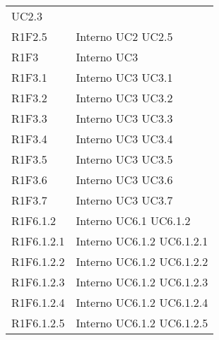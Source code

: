 \begin{longtable}{p{2.5cm}!{\VRule[1pt]}p{2.5cm}}
 \newline UC2.3
 \\
R1F2.5 & Interno \newline UC2
 \newline UC2.5
 \\
R1F3 & Interno \newline UC3
 \\
R1F3.1 & Interno \newline UC3
 \newline UC3.1
 \\
R1F3.2 & Interno \newline UC3
 \newline UC3.2
 \\
R1F3.3 & Interno \newline UC3
 \newline UC3.3
 \\
R1F3.4 & Interno \newline UC3
 \newline UC3.4
 \\
R1F3.5 & Interno \newline UC3
 \newline UC3.5
 \\
R1F3.6 & Interno \newline UC3
 \newline UC3.6
 \\
R1F3.7 & Interno \newline UC3
 \newline UC3.7
 \\
R1F6.1.2 & Interno \newline UC6.1
 \newline UC6.1.2
 \\
R1F6.1.2.1 & Interno \newline UC6.1.2
 \newline UC6.1.2.1
 \\
R1F6.1.2.2 & Interno \newline UC6.1.2
 \newline UC6.1.2.2
 \\
R1F6.1.2.3 & Interno \newline UC6.1.2
 \newline UC6.1.2.3
 \\
R1F6.1.2.4 & Interno \newline UC6.1.2
 \newline UC6.1.2.4
 \\
R1F6.1.2.5 & Interno \newline UC6.1.2
 \newline UC6.1.2.5

\end{longtable}
